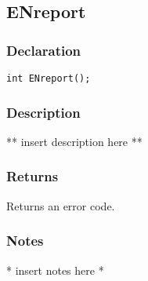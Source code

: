\subsection{ENreport}
\subsubsection{Declaration}
\begin{lstlisting}
int ENreport();
\end{lstlisting}
\subsubsection{Description}
** insert description here **
\subsubsection{Returns}
Returns an error code.
\subsubsection{Notes}
* insert notes here *